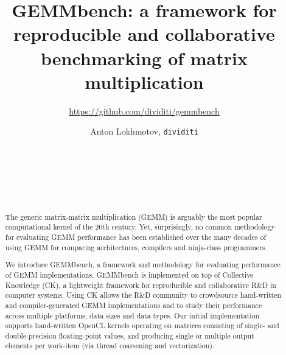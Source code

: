 \documentclass{acm_proc_article-sp} %
\begin{document}
\title{{GEMMbench}: a framework for reproducible and collaborative benchmarking
of matrix multiplication}
%
\subtitle{\LARGE \url{https://github.com/dividiti/gemmbench}}

\author{
\alignauthor
  Anton Lokhmotov, {\Large \tt dividiti}\\
  \\
  \\
  \\
  \\
  \\
}

\maketitle

\begin{abstract}

The generic matrix-matrix multiplication (GEMM) is arguably the most popular
computational kernel of the 20th century.
%
Yet, surprisingly, no common methodology for evaluating GEMM performance
has been established over the many decades of using GEMM for comparing
architectures, compilers and ninja-class programmers.

We introduce GEMMbench, a framework and methodology for evaluating performance
of GEMM implementations.
%
GEMMbench is implemented on top of Collective Knowledge (CK), a lightweight
framework for reproducible and collaborative R\&D in computer systems.
%
Using CK allows the R\&D community to crowdsource hand-written and
compiler-generated GEMM implementations and to study their performance across
multiple platforms, data sizes and data types.
%
Our initial implementation supports hand-written OpenCL kernels operating on
matrices consisting of single- and double-precision floating-point values, and
producing single or multiple output elements per work-item (via thread
coarsening and vectorization).


\end{abstract}


\end{document}
